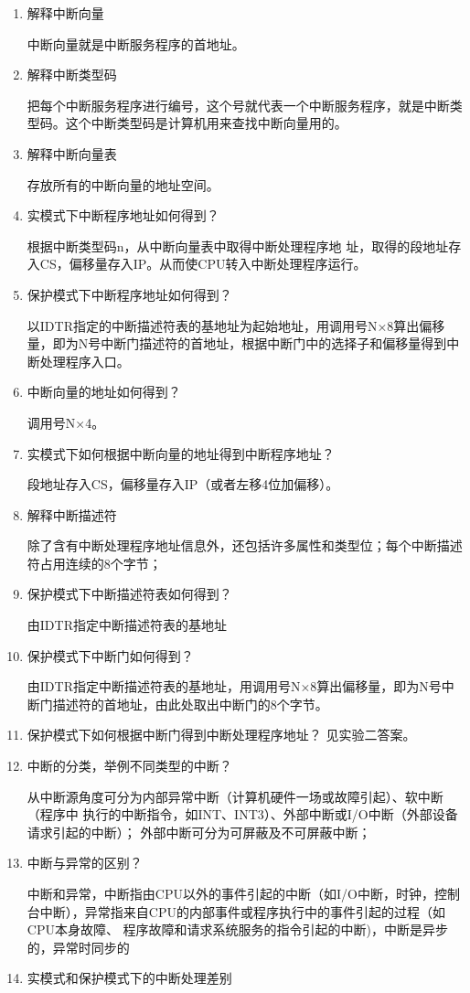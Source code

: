 \documentclass[a4paper]{article}
\begin{document}
\begin{enumerate}
	\item 解释中断向量
	
	中断向量就是中断服务程序的首地址。
	\item 解释中断类型码
	
	把每个中断服务程序进行编号，这个号就代表一个中断服务程序，就是中断类型码。这个中断类型码是计算机用来查找中断向量用的。
	\item 解释中断向量表
	
	存放所有的中断向量的地址空间。
	\item 实模式下中断程序地址如何得到？
	
	根据中断类型码n，从中断向量表中取得中断处理程序地 址，取得的段地址存入CS，偏移量存入IP。从而使CPU转入中断处理程序运行。
	\item 保护模式下中断程序地址如何得到？
	
	以IDTR指定的中断描述符表的基地址为起始地址，用调用号N×8算出偏移量，即为N号中断门描述符的首地址，根据中断门中的选择子和偏移量得到中断处理程序入口。
	\item 中断向量的地址如何得到？
	
	调用号N×4。
	\item 实模式下如何根据中断向量的地址得到中断程序地址？
	
	段地址存入CS，偏移量存入IP（或者左移4位加偏移）。
	\item 解释中断描述符
	
	除了含有中断处理程序地址信息外，还包括许多属性和类型位；每个中断描述符占用连续的8个字节；
	\item 保护模式下中断描述符表如何得到？
	
	由IDTR指定中断描述符表的基地址
	\item 保护模式下中断门如何得到？
	
	由IDTR指定中断描述符表的基地址，用调用号N×8算出偏移量，即为N号中断门描述符的首地址，由此处取出中断门的8个字节。
	\item 保护模式下如何根据中断门得到中断处理程序地址？
	见实验二答案。
	\item 中断的分类，举例不同类型的中断？
	
	从中断源角度可分为内部异常中断（计算机硬件一场或故障引起）、软中断（程序中
执行的中断指令，如INT、INT3）、外部中断或I/O中断（外部设备请求引起的中断）；
外部中断可分为可屏蔽及不可屏蔽中断；
	\item 中断与异常的区别？
	
	中断和异常，中断指由CPU以外的事件引起的中断（如I/O中断，时钟，控制
台中断），异常指来自CPU的内部事件或程序执行中的事件引起的过程（如CPU本身故障、
程序故障和请求系统服务的指令引起的中断)，中断是异步的，异常时同步的
	\item 实模式和保护模式下的中断处理差别
	

\end{enumerate}
\end{document}
